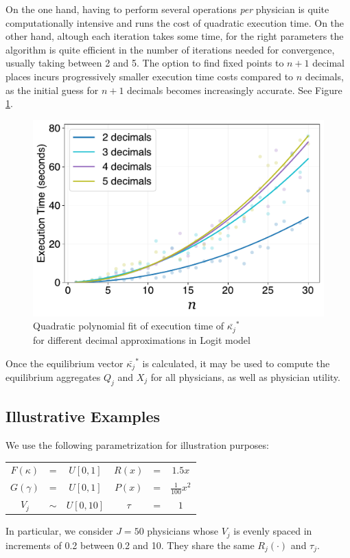 \documentclass[../main.tex]{subfiles}
\begin{document}
On the one hand, having to perform several operations \textit{per} physician is quite computationally intensive and runs the cost of quadratic execution time. On the other hand, altough each iteration takes some time, for the right parameters the algorithm is quite efficient in the number of iterations needed for convergence, usually taking between 2 and 5. The option to find fixed points to \( n + 1 \) decimal places incurs progressively smaller execution time costs compared to \( n \) decimals, as the initial guess for \( n + 1 \) decimals becomes increasingly accurate. See Figure \ref{fig:decimals}.

\begin{figure}[H]
\centering
\includegraphics[width=0.55\linewidth]{decimals.pdf}
\vspace{-0.25cm}
\captionsetup{justification=centerlast}
\caption{Quadratic polynomial fit of execution time of $\bar{\kappa_j}^*$ \\ for different decimal approximations in Logit model}
\label{fig:decimals}
\end{figure}

Once the equilibrium vector $\bar{\kappa_j}^*$ is calculated, it may be used to compute the equilibrium aggregates $Q_j$ and $X_j$ for all physicians, as well as physician utility.

\subsection{Illustrative Examples}
\label{sec:illustration}

We use the following parametrization for illustration purposes:
\begin{table}[H]
\centering
    \begin{tabular}{ccc|ccc}
        \toprule
            $F(\kappa)$ &=& $U[0,1]$ & $R(x)$ &=& $1.5x$\\
            $G(\gamma)$ &=& $U[0,1]$ & $P(x)$ &=& $\frac{1}{100}x^2$\\
            $V_j$ &$\sim$& $U[0,10]$ & $ \tau$ &=& $1$\\
        \bottomrule 
    \end{tabular}  
\end{table}
In particular, we consider $J = 50$ physicians whose $V_j$ is evenly spaced in increments of 0.2 between 0.2 and 10. They share the same $R_j(\cdot)$ and $\tau_j$.
\end{document}
